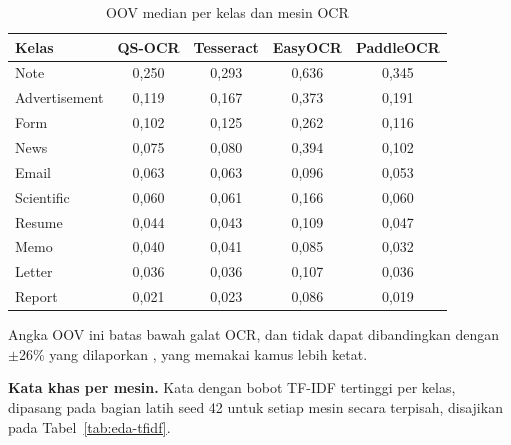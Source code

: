 \begin{table}[H]
  \centering
  \caption{OOV median per kelas dan mesin OCR}
  \label{tab:eda-oov}
  \fontsize{10}{12}\selectfont
  \begin{tabular}{|l|c|c|c|c|}
    \hline
    \textbf{Kelas} & \textbf{QS-OCR} & \textbf{Tesseract} & \textbf{EasyOCR} &
    \textbf{PaddleOCR} \\ \hline
    Note & 0,250 & 0,293 & 0,636 & 0,345 \\ \hline
    Advertisement & 0,119 & 0,167 & 0,373 & 0,191 \\ \hline
    Form & 0,102 & 0,125 & 0,262 & 0,116 \\ \hline
    News & 0,075 & 0,080 & 0,394 & 0,102 \\ \hline
    Email & 0,063 & 0,063 & 0,096 & 0,053 \\ \hline
    Scientific & 0,060 & 0,061 & 0,166 & 0,060 \\ \hline
    Resume & 0,044 & 0,043 & 0,109 & 0,047 \\ \hline
    Memo & 0,040 & 0,041 & 0,085 & 0,032 \\ \hline
    Letter & 0,036 & 0,036 & 0,107 & 0,036 \\ \hline
    Report & 0,021 & 0,023 & 0,086 & 0,019 \\ \hline
  \end{tabular}
\end{table}

Angka OOV ini batas bawah galat OCR, dan tidak dapat dibandingkan dengan $\pm$26\% yang
dilaporkan \textcite{audebert2020}, yang memakai kamus lebih ketat.

\textbf{Kata khas per mesin.} Kata dengan bobot TF-IDF tertinggi per kelas, dipasang pada
bagian latih seed 42 untuk setiap mesin secara terpisah, disajikan pada
Tabel~\ref{tab:eda-tfidf}.

